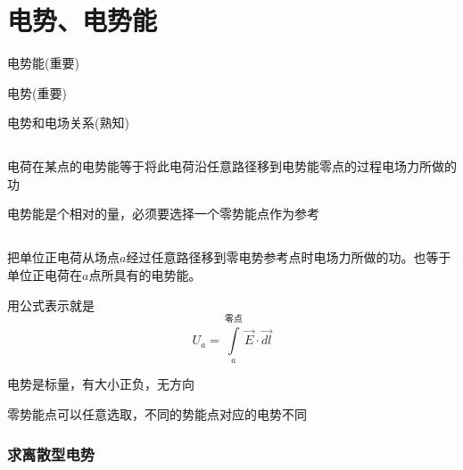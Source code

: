 \documentclass[lang=cn,10pt]{elegantbook}
\begin{document}
		\section{电势、电势能}
		\begin{introduction}
			\item 电势能(重要)
			\item 电势(重要)
			\item 电势和电场关系(熟知)
		\end{introduction}
		\subsection{\color{red} }
		\begin{definition}[电势能]
			电荷在某点的电势能等于将此电荷沿任意路径移到电势能零点的过程电场力所做的功
		\end{definition}
		\begin{note}
			电势能是个相对的量，必须要选择一个零势能点作为参考
		\end{note}
	
		\subsection{\color{red} }
		\begin{definition}[电势]
			把单位正电荷从场点$a$经过任意路径移到零电势参考点时电场力所做的功。也等于单位正电荷在$a$点所具有的电势能。
			
			用公式表示就是
			\begin{equation*}
				U_a=\int\limits_a^{\text{零点}}{\overrightarrow{E}\cdot \overrightarrow{dl}}
			\end{equation*}
		\end{definition}
		\begin{remark}
			电势是标量，有大小正负，无方向
		\end{remark}
		\begin{remark}
			零势能点可以任意选取，不同的势能点对应的电势不同
		\end{remark}
		\subsubsection{求离散型电势}
		
\end{document}
